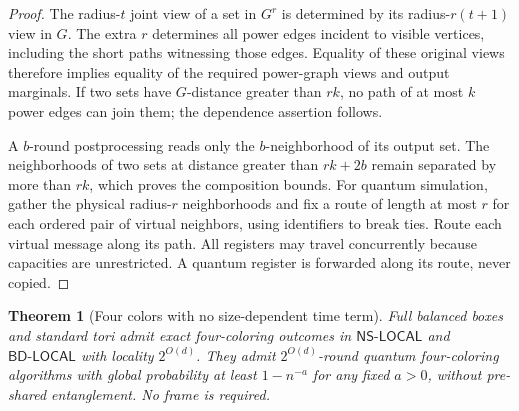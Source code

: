 \documentclass[11pt]{article}
\newtheorem{theorem}{Theorem}[section]
\theoremstyle{definition}\newtheorem{definition}[theorem]{Definition}
\theoremstyle{remark}\newtheorem{remark}[theorem]{Remark}
\newcommand{\NS}{\mathsf{NS\text{-}LOCAL}}
\newcommand{\BD}{\mathsf{BD\text{-}LOCAL}}
\begin{document}
\begin{proof}
The radius-$t$ joint view of a set in $G^r$ is determined by
its radius-$r(t+1)$ view in $G$. The extra $r$ determines all
power edges incident to visible vertices, including the
short paths witnessing those edges. Equality of these original
views therefore implies equality of the required power-graph
views and output marginals. If two sets have $G$-distance
greater than $rk$, no path of at most $k$ power edges can join
them; the dependence assertion follows.

A $b$-round postprocessing reads only the $b$-neighborhood of
its output set. The neighborhoods of two sets at distance
greater than $rk+2b$ remain separated by more than $rk$,
which proves the composition bounds. For quantum simulation,
gather the physical radius-$r$ neighborhoods and fix a route
of length at most $r$ for each ordered pair of virtual
neighbors, using identifiers to break ties. Route each virtual
message along its path. All registers may travel concurrently
because capacities are unrestricted. A quantum register is
forwarded along its route, never copied.
\end{proof}

\begin{theorem}[Four colors with no size-dependent time term]
\label{thm:strongupper}
Full balanced boxes and standard tori admit exact four-coloring
outcomes in $\NS$ and $\BD$ with locality $2^{O(d)}$.
They admit $2^{O(d)}$-round quantum four-coloring algorithms
with global probability at least $1-n^{-a}$ for any fixed $a>0$,
without pre-shared entanglement. No frame is required.
\end{theorem}
\end{document}
